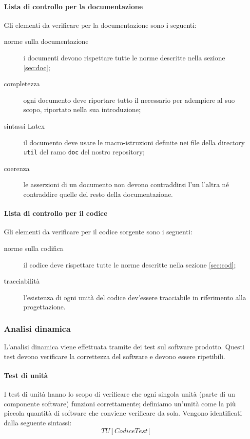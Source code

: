 	\paragraph{Lista di controllo per la documentazione} Gli elementi da verificare per la documentazione sono i seguenti:
	\begin{description} %
		\item[norme sulla documentazione] i documenti devono rispettare tutte le norme descritte nella sezione \ref{sec:doc};
		\item[completezza] ogni documento deve riportare tutto il necessario per adempiere al suo scopo, riportato nella sua introduzione;
		\item[sintassi Latex] il documento deve usare le macro-istruzioni definite nei file della directory \texttt{util} del ramo \texttt{doc} del nostro repository;
		\item[coerenza] le asserzioni di un documento non devono contraddirsi l'un l'altra né contraddire quelle del resto della documentazione.
	\end{description}
	\paragraph{Lista di controllo per il codice} Gli elementi da verificare per il codice sorgente sono i seguenti:
	\begin{description} %
		\item[norme sulla codifica] il codice deve rispettare tutte le norme descritte nella sezione \ref{sec:cod};
		\item[tracciabilità] l'esistenza di ogni unità del codice dev'essere tracciabile in riferimento alla progettazione.
	\end{description}
 
	\subsubsection{Analisi dinamica}
	L'analisi dinamica viene effettuata tramite dei test sul software prodotto. Questi test devono verificare la correttezza del software e devono essere ripetibili.
	\paragraph{Test di unità}
		I test di unità hanno lo scopo di verificare che ogni singola unità (parte di un componente software) funzioni correttamente; definiamo un'unità come la più piccola quantità di software che conviene verificare da sola. Vengono identificati dalla seguente sintassi:
			\[TU[Codice Test]\]
